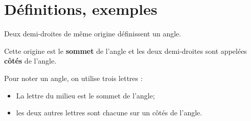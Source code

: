 \documentclass[11pt]{article}
\begin{document}
\section{Définitions, exemples}

\begin{definition}
Deux demi-droites de même origine définissent un angle.
\end{definition}

\begin{vocabulaire}
Cette origine est le \textbf{sommet} de l'angle et les deux demi-droites sont
appelées \textbf{côtés} de l'angle.
\end{vocabulaire}

\begin{notation}
Pour noter un angle, on utilise trois lettres :
\begin{itemize}
\item La lettre du milieu est le sommet de l'angle;
\item les deux autres lettres sont chacune sur un côtés de l'angle.
\end{itemize}
\end{notation}
\end{document}
